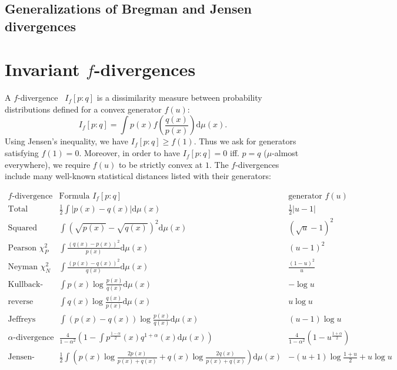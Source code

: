 \documentclass[11pt]{article}
\def\dmu{\mathrm{d}\mu}
\def\dmu{\mathrm{d}\mu}
\begin{document}
\subsection{Generalizations of Bregman and Jensen divergences}




\section{Invariant {\protect $f$-divergences}}

A $f$-divergence~\cite{Morimoto-1963,EN-PhD-Csiszar-1967,fdiv-AliSilvey-1966,Csiszar-1972} $I_f[p:q]$ is a dissimilarity measure between probability distributions defined for a convex generator $f(u)$:
$$
I_f[p:q]=\int p(x) f\left(\frac{q(x)}{p(x)}\right) \dmu(x).
$$
Using Jensen's inequality, we have $I_f[p:q]\geq f(1)$. Thus we ask for generators satisfying $f(1)=0$.
Moreover, in order to have $I_f[p:q]=0$ iff. $p=q$ ($\mu$-almost everywhere), we require $f(u)$ to be strictly convex at $1$.
The $f$-divergences include many well-known statistical distances listed with their generators: %

\begin{center}
$
\begin{array}{lll}
\text{$f$-divergence } & \text{Formula $I_f[p:q]$} & \text{generator $f(u)$}\\
\hline\hline
\text{Total variation (metric)} & \frac{1}{2}\int |p(x)-q(x)| \dmu(x) & \frac{1}{2} |u-1| \\
\text{Squared Hellinger} & \int (\sqrt{p(x)}-\sqrt{q(x)})^2 \dmu(x) & (\sqrt{u}-1)^2\\
\text{Pearson $\chi^2_P$}  &  \int \frac{(q(x)-p(x))^2}{p(x)} \dmu(x) & (u-1)^2\\
\text{Neyman $\chi^2_N$}  &  \int \frac{(p(x)-q(x))^2}{q(x)} \dmu(x) & \frac{(1-u)^2}{u}\\
\text{Kullback-Leibler} & \int p(x)\log \frac{p(x)}{q(x)} \dmu(x) & -\log u\\
\text{reverse Kullback-Leibler} & \int q(x)\log \frac{q(x)}{p(x)} \dmu(x) & u\log u \\
\text{Jeffreys divergence} &\int (p(x)-q(x))\log\frac{p(x)}{q(x)} \dmu(x) & (u-1)\log u\\
\text{$\alpha$-divergence} &  \frac{4}{1-\alpha^2} (1-\int p^{\frac{1-\alpha}{2}}(x) q^{1+\alpha}(x) \dmu(x))  & \frac{4}{1-\alpha^2}(1-u^{\frac{1+\alpha}{2}})\\ 
\text{Jensen-Shannon} & \frac{1}{2}\int (p(x)\log \frac{2p(x)}{p(x)+q(x)} +  q(x)\log \frac{2q(x)}{p(x)+q(x)})\dmu(x) 
&  -(u+1)\log \frac{1+u}{2} + u\log u\\
\end{array}
$
\end{center}
\end{document}
